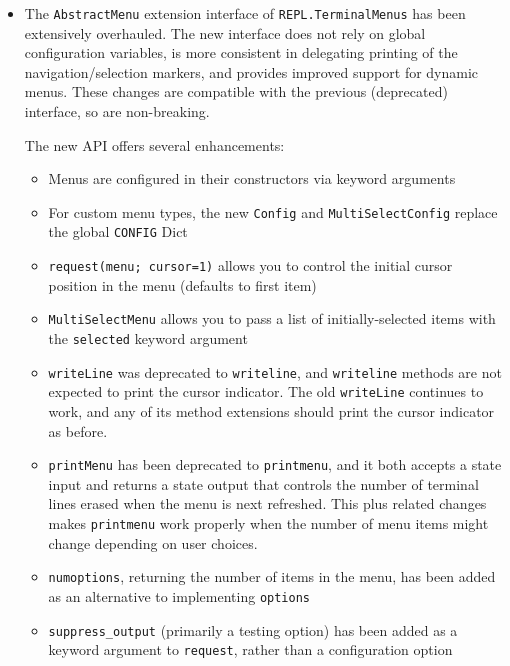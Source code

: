 \begin{itemize}
\item The \texttt{AbstractMenu} extension interface of \texttt{REPL.TerminalMenus} has been extensively overhauled. The new interface does not rely on global configuration variables, is more consistent in delegating printing of the navigation/selection markers, and provides improved support for dynamic menus.  These changes are compatible with the previous (deprecated) interface, so are non-breaking.

The new API offers several enhancements:

\begin{itemize}
\item Menus are configured in their constructors via keyword arguments


\item For custom menu types, the new \texttt{Config} and \texttt{MultiSelectConfig} replace the global \texttt{CONFIG} Dict


\item \texttt{request(menu; cursor=1)} allows you to control the initial cursor position in the menu (defaults to first item)


\item \texttt{MultiSelectMenu} allows you to pass a list of initially-selected items with the \texttt{selected} keyword argument


\item \texttt{writeLine} was deprecated to \texttt{writeline}, and \texttt{writeline} methods are not expected to print the cursor indicator. The old \texttt{writeLine} continues to work, and any of its method extensions should print the cursor indicator as before.


\item \texttt{printMenu} has been deprecated to \texttt{printmenu}, and it both accepts a state input and returns a state output that controls the number of terminal lines erased when the menu is next refreshed. This plus related changes makes \texttt{printmenu} work properly when the number of menu items might change depending on user choices.


\item \texttt{numoptions}, returning the number of items in the menu, has been added as an alternative to implementing \texttt{options}


\item \texttt{suppress\_output} (primarily a testing option) has been added as a keyword argument to \texttt{request}, rather than a configuration option

\end{itemize}
\end{itemize}



